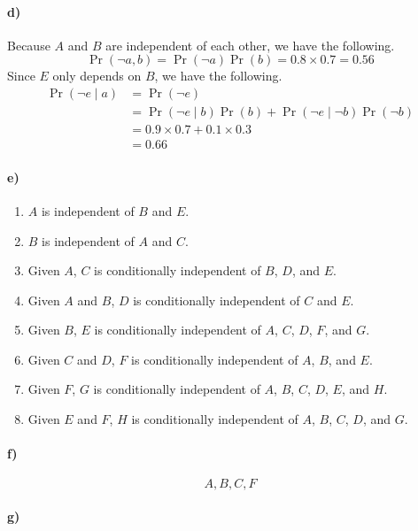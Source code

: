 \documentclass[12pt]{article}
\begin{document}
\paragraph{d)}

Because \(A\) and \(B\) are independent of each other, we have the following.
\[\Pr(\lnot a, b)=\Pr(\lnot a)\Pr(b)=0.8\times 0.7 = 0.56\]
Since \(E\) only depends on \(B\), we have the following.
\begin{align*}
        \Pr(\lnot e \mid a) &= \Pr(\lnot e)\\
        &=\Pr(\lnot e\mid b)\Pr(b) + \Pr(\lnot e\mid \lnot b)\Pr(\lnot b)\\
        &=0.9\times 0.7 + 0.1\times 0.3\\
        &=0.66
\end{align*}

\paragraph{e)}

\begin{enumerate}
        \item \(A\) is independent of \(B\) and \(E\).
        \item \(B\) is independent of \(A\) and \(C\).
        \item Given \(A\), \(C\) is conditionally independent of \(B\), \(D\), and \(E\).
        \item Given \(A\) and \(B\), \(D\) is conditionally independent of \(C\) and \(E\).
        \item Given \(B\), \(E\) is conditionally independent of \(A\), \(C\), \(D\), \(F\), and \(G\).
        \item Given \(C\) and \(D\), \(F\) is conditionally independent of \(A\), \(B\), and \(E\).
        \item Given \(F\), \(G\) is conditionally independent of \(A\), \(B\), \(C\), \(D\), \(E\), and \(H\).
        \item Given \(E\) and \(F\), \(H\) is conditionally independent of \(A\), \(B\), \(C\), \(D\), and \(G\).
\end{enumerate}

\paragraph{f)}

\[A,B,C,F\]

\paragraph{g)}
\end{document}
